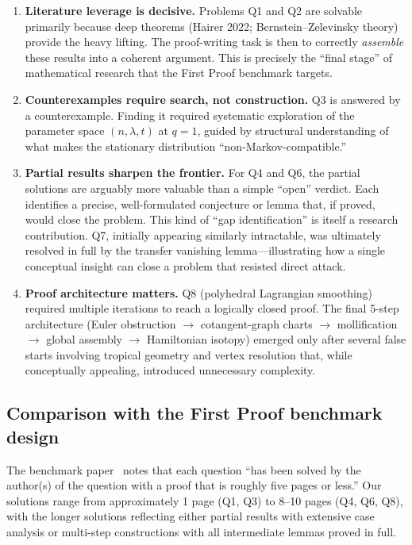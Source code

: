 \begin{enumerate}[nosep]
\item \textbf{Literature leverage is decisive.}
  Problems Q1 and Q2 are solvable primarily because deep theorems
  (Hairer 2022; Bernstein--Zelevinsky theory) provide the heavy lifting.
  The proof-writing task is then to correctly \emph{assemble} these results
  into a coherent argument.  This is precisely the ``final stage'' of
  mathematical research that the First Proof benchmark targets.

\item \textbf{Counterexamples require search, not construction.}
  Q3 is answered by a counterexample.  Finding it required systematic
  exploration of the parameter space $(n, \lambda, t)$ at $q=1$,
  guided by structural understanding of what makes the stationary
  distribution ``non-Markov-compatible.''

\item \textbf{Partial results sharpen the frontier.}
  For Q4 and Q6, the partial solutions are arguably more valuable
  than a simple ``open'' verdict.  Each identifies a precise, well-formulated
  conjecture or lemma that, if proved, would close the problem.
  This kind of ``gap identification'' is itself a research contribution.
  Q7, initially appearing similarly intractable, was ultimately resolved
  in full by the transfer vanishing lemma---illustrating how a single
  conceptual insight can close a problem that resisted direct attack.

\item \textbf{Proof architecture matters.}
  Q8 (polyhedral Lagrangian smoothing) required multiple iterations to
  reach a logically closed proof.  The final 5-step architecture
  (Euler obstruction $\to$ cotangent-graph charts $\to$ mollification
  $\to$ global assembly $\to$ Hamiltonian isotopy) emerged only after
  several false starts involving tropical geometry and vertex resolution
  that, while conceptually appealing, introduced unnecessary complexity.
\end{enumerate}

\subsection{Comparison with the First Proof benchmark design}

The benchmark paper~\cite{firstproof} notes that each question
``has been solved by the author(s) of the question with a proof that is
roughly five pages or less.''  Our solutions range from approximately
1 page (Q1, Q3) to 8--10 pages (Q4, Q6, Q8), with the longer solutions
reflecting either partial results with extensive case analysis or
multi-step constructions with all intermediate lemmas proved in full.

